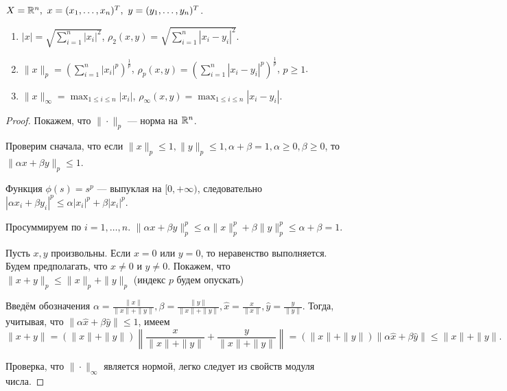 
\begin{example}
    $X = \mathbb{R}^n, \ x = (x_1, \ldots, x_n)^T, \ y = (y_1, \ldots, y_n)^T$.

    \begin{enumerate}
        \item $|x| = \sqrt{\sum_{i = 1}^n |x_i|^2}$, $\rho_2(x, y) = \sqrt{\sum_{i = 1}^n |x_i - y_i|^2}$.
        \item $\|x\|_p = \left(\sum_{i = 1}^n |x_i|^p\right)^{\frac{1}{p}}$, $\rho_p(x, y) = \left(\sum_{i = 1}^n |x_i - y_i|^p\right)^{\frac{1}{p}}$, $p \ge 1$.
        \item $\|x\|_\infty = \max_{1 \le i \le n} |x_i|$, $\rho_\infty(x, y) = \max_{1 \le i \le n} |x_i - y_i|$.
    \end{enumerate}

\end{example}

\begin{proof}
    Покажем, что $\|\cdot\|_p$ --- норма на $\mathbb{R}^n$.
    
    Проверим сначала, что если $\|x\|_p \le 1, \|y\|_p \le 1, \alpha + \beta = 1, \alpha \ge 0, \beta \ge 0$, то $\|\alpha x + \beta y\|_p \le 1$.
    
    Функция $\phi(s) = s^p$ --- выпуклая на $[0, +\infty)$, следовательно $|\alpha x_i + \beta y_i|^p \le \alpha |x_i|^p + \beta |x_i|^p$.
    
    Просуммируем по $i = 1, \ldots, n$.
    $\|\alpha x + \beta y \|^p_p \le \alpha \|x\|^p_p + \beta \|y\|^p_p \le \alpha + \beta = 1$.
    
    Пусть $x, y$ произвольны. Если $x = 0$ или $y = 0$, то неравенство выполняется. Будем предполагать, что $x \neq 0$ и $y \neq 0$. Покажем, что $\|x + y\|_p \le \|x\|_p + \|y\|_p$ (индекс $p$ будем опускать)
    
    Введём обозначения $\alpha = \frac{\|x\|}{\|x\| + \|y\|}, \beta = \frac{\|y\|}{\|x\| + \|y\|}, \hat{x} = \frac{x}{\|x\|}, \hat{y} = \frac{y}{\|y\|}$. Тогда, учитывая, что $\|\alpha \hat{x} + \beta \hat{y}\| \le 1$, имеем
    \[
        \|x + y\| = \left(\|x\| + \|y\|\right) \left\|\frac{x}{\|x\| + \|y\|} + \frac{y}{\|x\| + \|y\|}\right\| = \left(\|x\| + \|y\|\right)\|\alpha \hat{x} + \beta \hat{y}\| \le \|x\| + \|y\|.
    \]

    Проверка, что $\|\cdot\|_{\infty}$ является нормой, легко следует из свойств модуля числа.
\end{proof}

